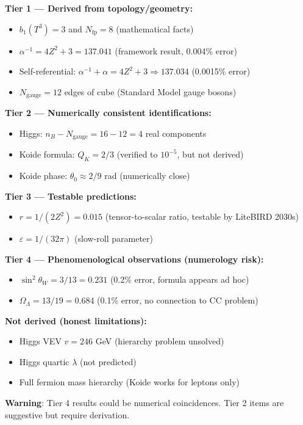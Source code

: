 \documentclass[12pt,a4paper]{article}
\newcommand{\Zsq}{Z^2}
\begin{document}
\begin{tcolorbox}[colback=red!5!white, colframe=red!60!black, title=Epistemic Classification of All Claims]
\textbf{Tier 1 --- Derived from topology/geometry:}
\begin{itemize}[itemsep=0pt]
    \item $b_1(T^3) = 3$ and $N_{\text{fp}} = 8$ (mathematical facts)
    \item $\alpha^{-1} = 4\Zsq + 3 = 137.041$ (framework result, 0.004\% error)
    \item Self-referential: $\alpha^{-1} + \alpha = 4\Zsq + 3 \Rightarrow 137.034$ (0.0015\% error)
    \item $N_{\text{gauge}} = 12$ edges of cube (Standard Model gauge bosons)
\end{itemize}

\textbf{Tier 2 --- Numerically consistent identifications:}
\begin{itemize}[itemsep=0pt]
    \item Higgs: $n_B - N_{\text{gauge}} = 16 - 12 = 4$ real components
    \item Koide formula: $Q_K = 2/3$ (verified to $10^{-5}$, but not derived)
    \item Koide phase: $\theta_0 \approx 2/9$ rad (numerically close)
\end{itemize}

\textbf{Tier 3 --- Testable predictions:}
\begin{itemize}[itemsep=0pt]
    \item $r = 1/(2\Zsq) = 0.015$ (tensor-to-scalar ratio, testable by LiteBIRD 2030s)
    \item $\varepsilon = 1/(32\pi)$ (slow-roll parameter)
\end{itemize}

\textbf{Tier 4 --- Phenomenological observations (numerology risk):}
\begin{itemize}[itemsep=0pt]
    \item $\sin^2\theta_W = 3/13 = 0.231$ (0.2\% error, formula appears ad hoc)
    \item $\Omega_\Lambda = 13/19 = 0.684$ (0.1\% error, no connection to CC problem)
\end{itemize}

\textbf{Not derived (honest limitations):}
\begin{itemize}[itemsep=0pt]
    \item Higgs VEV $v = 246$ GeV (hierarchy problem unsolved)
    \item Higgs quartic $\lambda$ (not predicted)
    \item Full fermion mass hierarchy (Koide works for leptons only)
\end{itemize}

\textbf{Warning}: Tier 4 results could be numerical coincidences. Tier 2 items are suggestive but require derivation.
\end{tcolorbox}
\end{document}
